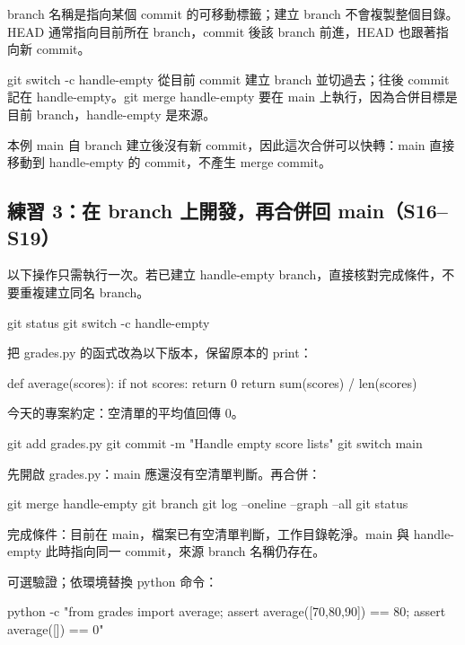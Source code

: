 \documentclass[11pt,a4paper]{article}
\DeclareRobustCommand{\code}[1]{{\small\ttfamily #1}}
\begin{document}
branch 名稱是指向某個 commit 的可移動標籤；建立 branch 不會複製整個目錄。\code{HEAD} 通常指向目前所在 branch，commit 後該 branch 前進，\code{HEAD} 也跟著指向新 commit。

\code{git switch -c handle-empty} 從目前 commit 建立 branch 並切過去；往後 commit 記在 \code{handle-empty}。\code{git merge handle-empty} 要在 \code{main} 上執行，因為合併目標是目前 branch，\code{handle-empty} 是來源。

本例 \code{main} 自 branch 建立後沒有新 commit，因此這次合併可以快轉：\code{main} 直接移動到 \code{handle-empty} 的 commit，不產生 merge commit。

\subsection{練習 3：在 branch 上開發，再合併回 \code{main}（S16–S19）}

以下操作只需執行一次。若已建立 \code{handle-empty} branch，直接核對完成條件，不要重複建立同名 branch。

\begin{Code}
git status
git switch -c handle-empty
\end{Code}

把 \code{grades.py} 的函式改為以下版本，保留原本的 \code{print}：

\begin{Code}
def average(scores):
    if not scores:
        return 0
    return sum(scores) / len(scores)
\end{Code}

今天的專案約定：空清單的平均值回傳 0。

\begin{Code}
git add grades.py
git commit -m "Handle empty score lists"
git switch main
\end{Code}

先開啟 \code{grades.py}：\code{main} 應還沒有空清單判斷。再合併：

\begin{Code}
git merge handle-empty
git branch
git log --oneline --graph --all
git status
\end{Code}

完成條件：目前在 \code{main}，檔案已有空清單判斷，工作目錄乾淨。\code{main} 與 \code{handle-empty} 此時指向同一 commit，來源 branch 名稱仍存在。

可選驗證；依環境替換 \code{python} 命令：

\begin{Code}
python -c "from grades import average; assert average([70,80,90]) == 80; assert average([]) == 0"
\end{Code}
\end{document}
